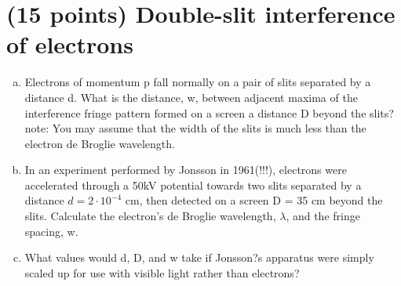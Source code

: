 \documentclass[ps1.tex]{subfiles}
\begin{document}
\section* {(15 points) Double-slit interference of electrons}

\begin{enumerate}[(a)]
\item Electrons of momentum p fall normally on a pair of slits separated by a distance d. What is the distance, w, between adjacent maxima of the interference fringe pattern formed on a screen a distance D beyond the slits? note: You may assume that the width of the slits is much less than the electron de Broglie wavelength.

\item In an experiment performed by Jonsson in 1961(!!!), electrons were accelerated through a 50kV potential towards two slits separated by a distance $d = 2\cdot10^{-4}$ cm, then detected on a screen D = 35 cm beyond the slits. Calculate the electron's de Broglie wavelength, $\lambda$, and the fringe spacing, w.
\item What values would d, D, and w take if Jonsson?s apparatus were simply scaled up for use with visible light rather than electrons?
\end{enumerate}

\noindent\makebox[\linewidth]{\rule{\paperwidth}{0.4pt}}
\end{document}
